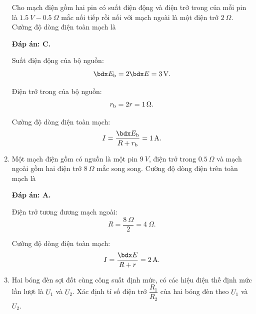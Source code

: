 \begin{enumerate}[label=\bfseries Câu \arabic*:]
	\cauhoi
	{Cho mạch điện gồm hai pin có suất điện động và điện trở trong của mỗi pin là $\SI{1.5}{V} - \SI{0.5}{\Omega}$ mắc nối tiếp rồi nối với mạch ngoài là một điện trở $\SI{2}{\Omega}$. Cường độ dòng điện toàn mạch là
		
	}
	\loigiai
	{	\textbf{Đáp án: C.}
		
		Suất điện động của bộ nguồn:
		$$\calE_\text b = 2\calE = \SI{3}{V}.$$
		
		Điện trở trong của bộ nguồn:
		$$r_\text b = 2 r = \SI{1}{\Omega}.$$
		
		Cường độ dòng điện toàn mạch:
		$$I=\dfrac{\calE_\text b}{R + r_\text b} = \SI{1}{A}.$$
	}
	\item {}
	
	\cauhoi
	{Một mạch điện gồm có nguồn là một pin $\SI{9}{V}$, điện trở trong $\SI{0.5}{\Omega}$ và mạch ngoài gồm hai điện trở $\SI{8}{\Omega}$ mắc song song. Cường độ dòng điện trên toàn mạch là
		
	}
	\loigiai
	{	\textbf{Đáp án: A.}
		
		Điện trở tương đương mạch ngoài:
		$$R = \dfrac{\SI{8}{\Omega}}{2} = \SI{4}{\Omega}.$$
		
		Cường độ dòng điện toàn mạch:
		$$I=\dfrac{\calE}{R + r} = \SI{2}{A}.$$
	}
	\item {}
	
	\cauhoi
	{Hai bóng đèn sợi đốt cùng công suất định mức, có các hiệu điện thế định mức lần lượt là $U_1$ và $U_2$. Xác định tỉ số điện trở $\dfrac{R_1}{R_2}$ của hai bóng đèn theo $U_1$ và $U_2$.
		
}
\end{enumerate}

